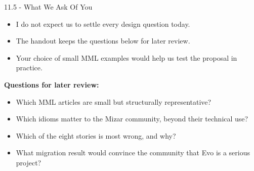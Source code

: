 \documentclass[aspectratio=169,11pt]{beamer}
\begin{document}
\begin{frame}[fragile,t]{11.5 - What We Ask Of You}
\begin{itemize}
\setlength{\itemsep}{1pt}
\setlength{\parsep}{0pt}
\setlength{\parskip}{0pt}
\item I do not expect us to settle every design question today.
\item The handout keeps the questions below for later review.
\item Your choice of small MML examples would help us test the proposal in practice.
\end{itemize}
\smallskip
\textbf{Questions for later review:}
\begin{itemize}
\setlength{\itemsep}{1pt}
\setlength{\parsep}{0pt}
\setlength{\parskip}{0pt}
\item Which MML articles are small but structurally representative?
\item Which idioms matter to the Mizar community, beyond their technical use?
\item Which of the eight stories is most wrong, and why?
\item What migration result would convince the community that Evo is a serious project?
\end{itemize}
\end{frame}
\end{document}
